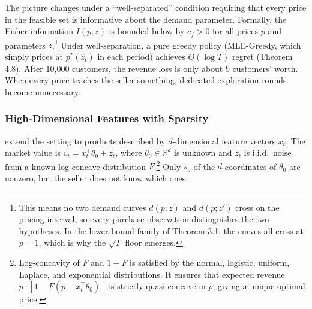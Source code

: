 The picture changes under a ``well-separated'' condition requiring that every price in the feasible set is informative about the demand parameter. Formally, the Fisher information $I(p, z)$ is bounded below by $c_f > 0$ for all prices $p$ and parameters $z$.\footnote{This means no two demand curves $d(p; z)$ and $d(p; z')$ cross on the pricing interval, so every purchase observation distinguishes the two hypotheses. In the lower-bound family of Theorem 3.1, the curves all cross at $p = 1$, which is why the $\sqrt{T}$ floor emerges.} Under well-separation, a pure greedy policy (MLE-Greedy, which simply prices at $p^*(\hat{z}_t)$ in each period) achieves $O(\log T)$ regret (Theorem 4.8). After 10,000 customers, the revenue loss is only about 9 customers' worth. When every price teaches the seller something, dedicated exploration rounds become unnecessary.

\subsubsection{High-Dimensional Features with Sparsity}
\label{sec:javanmard}

\citet{Javanmard2019} extend the setting to products described by $d$-dimensional feature vectors $x_t$. The market value is $v_t = x_t^\top \theta_0 + z_t$, where $\theta_0 \in \mathbb{R}^d$ is unknown and $z_t$ is i.i.d.\ noise from a known log-concave distribution $F$.\footnote{Log-concavity of $F$ and $1 - F$ is satisfied by the normal, logistic, uniform, Laplace, and exponential distributions. It ensures that expected revenue $p \cdot [1 - F(p - x_t^\top \theta_0)]$ is strictly quasi-concave in $p$, giving a unique optimal price.} Only $s_0$ of the $d$ coordinates of $\theta_0$ are nonzero, but the seller does not know which ones.


